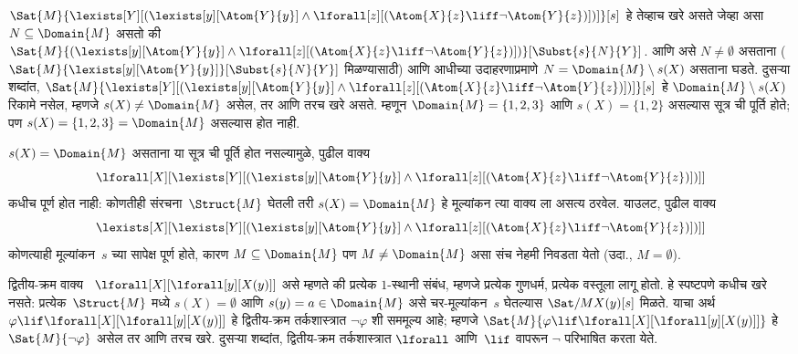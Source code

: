 \begin{ex}
  $\Sat{M}{\lexists[Y][(\lexists[y][\Atom{Y}{y}] \land
  \lforall[z][(\Atom{X}{z} \liff \lnot \Atom{Y}{z})])]}[s]$
  हे तेव्हाच खरे
  असते जेव्हा
  असा $N \subseteq \Domain{M}$
  असतो की
  $\Sat{M}{(\lexists[y][\Atom{Y}{y}] \land \lforall[z][(\Atom{X}{z}
  \liff \lnot \Atom{Y}{z})])}[\Subst{s}{N}{Y}]$.
  आणि असे
  $N \neq \emptyset$
  असताना
  ($\Sat{M}{\lexists[y][\Atom{Y}{y}]}[\Subst{s}{N}{Y}]$
  मिळण्यासाठी)
  आणि आधीच्या
  उदाहरणाप्रमाणे
  $N = \Domain{M} \setminus s(X)$
  असताना घडते.
  दुसऱ्या शब्दांत,
  $\Sat{M}{\lexists[Y][(\lexists[y][\Atom{Y}{y}] \land
  \lforall[z][(\Atom{X}{z} \liff \lnot \Atom{Y}{z})])]}[s]$
  हे
  $\Domain{M} \setminus s(X)$
  रिकामे नसेल,
  म्हणजे
  $s(X) \neq
  \Domain{M}$
  असेल, तर आणि
  तरच खरे असते.
  म्हणून
  $\Domain{M}
  = \{1, 2, 3\}$
  आणि
  $s(X) = \{1, 2\}$
  असल्यास
  सूत्र
  ची पूर्ति होते;
  पण
  $s(X) = \{1, 2, 3\}
  = \Domain{M}$
  असल्यास होत नाही.

  $s(X) = \Domain{M}$
  असताना या
  सूत्र
  ची पूर्ति
  होत नसल्यामुळे,
  पुढील
  वाक्य
  \[  \lforall[X][\lexists[Y][(\lexists[y][\Atom{Y}{y}] \land
      \lforall[z][(\Atom{X}{z} \liff \lnot \Atom{Y}{z})])]]
  \]
  कधीच पूर्ण
  होत नाही:
  कोणतीही
  संरचना~$\Struct{M}$
  घेतली तरी
  $s(X) = \Domain{M}$
  हे मूल्यांकन
  त्या
  वाक्य
  ला असत्य
  ठरवेल.
  याउलट,
  पुढील वाक्य
  \[  \lexists[X][\lexists[Y][(\lexists[y][\Atom{Y}{y}] \land
      \lforall[z][(\Atom{X}{z} \liff \lnot \Atom{Y}{z})])]]
  \]
  कोणत्याही
  मूल्यांकन~$s$
  च्या सापेक्ष
  पूर्ण होते,
  कारण
  $M \subseteq \Domain{M}$
  पण
  $M \neq \Domain{M}$
  असा संच नेहमी
  निवडता येतो
  (उदा.,
  $M = \emptyset$).
\end{ex}

\begin{ex}
  द्वितीय-क्रम
  वाक्य~
  $\lforall[X][\lforall[y][X(y)]]$
  असे म्हणते की
  प्रत्येक
  $1$-स्थानी
  संबंध, म्हणजे
  प्रत्येक
  गुणधर्म, प्रत्येक
  वस्तूला लागू
  होतो.
  हे स्पष्टपणे
  कधीच खरे नसते:
  प्रत्येक~$\Struct{M}$
  मध्ये
  $s(X) = \emptyset$
  आणि
  $s(y) = a \in
  \Domain{M}$
  असे चर-मूल्यांकन~$s$
  घेतल्यास
  $\Sat/{M}{X(y)}[s]$
  मिळते.
  याचा अर्थ
  $\varphi \lif
  \lforall[X][\lforall[y][X(y)]]$
  हे द्वितीय-क्रम
  तर्कशास्त्रात
  $\lnot \varphi$
  शी सममूल्य
  आहे; म्हणजे
  $\Sat{M}{\varphi \lif
  \lforall[X][\lforall[y][X(y)]]}$
  हे
  $\Sat{M}{\lnot \varphi}$
  असेल तर आणि
  तरच खरे.
  दुसऱ्या शब्दांत,
  द्वितीय-क्रम
  तर्कशास्त्रात
  $\lforall$
  आणि~$\lif$
  वापरून
  $\lnot$
  परिभाषित
  करता येते.
\end{ex}

